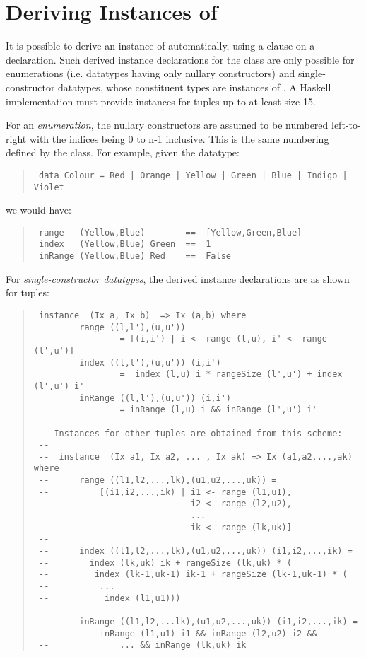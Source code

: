 \section{Deriving Instances of 
}
It is possible to derive an instance of  automatically, using
a  clause on a  declaration.
Such derived instance declarations for the class  are only possible
for enumerations (i.e. datatypes having
only nullary constructors) and single-constructor datatypes,
whose constituent types are instances of .   A Haskell implementation
must provide  instances for tuples up to at least size 15.
\par
For an \emph{enumeration}, the nullary constructors are assumed to be
numbered left-to-right with the indices being 0 to n-1 inclusive.
This is the same numbering defined by the  class.  For example,
given the datatype:
\par
\begin{quote}
{\haddockverb\begin{verbatim}
 data Colour = Red | Orange | Yellow | Green | Blue | Indigo | Violet
\end{verbatim}}
\end{quote}
we would have:
\par
\begin{quote}
{\haddockverb\begin{verbatim}
 range   (Yellow,Blue)        ==  [Yellow,Green,Blue]
 index   (Yellow,Blue) Green  ==  1
 inRange (Yellow,Blue) Red    ==  False
\end{verbatim}}
\end{quote}
For \emph{single-constructor datatypes}, the derived instance declarations
are as shown for tuples:
\par
\begin{quote}
{\haddockverb\begin{verbatim}
 instance  (Ix a, Ix b)  => Ix (a,b) where
         range ((l,l'),(u,u'))
                 = [(i,i') | i <- range (l,u), i' <- range (l',u')]
         index ((l,l'),(u,u')) (i,i')
                 =  index (l,u) i * rangeSize (l',u') + index (l',u') i'
         inRange ((l,l'),(u,u')) (i,i')
                 = inRange (l,u) i && inRange (l',u') i'
 
 -- Instances for other tuples are obtained from this scheme:
 --
 --  instance  (Ix a1, Ix a2, ... , Ix ak) => Ix (a1,a2,...,ak)  where
 --      range ((l1,l2,...,lk),(u1,u2,...,uk)) =
 --          [(i1,i2,...,ik) | i1 <- range (l1,u1),
 --                            i2 <- range (l2,u2),
 --                            ...
 --                            ik <- range (lk,uk)]
 --
 --      index ((l1,l2,...,lk),(u1,u2,...,uk)) (i1,i2,...,ik) =
 --        index (lk,uk) ik + rangeSize (lk,uk) * (
 --         index (lk-1,uk-1) ik-1 + rangeSize (lk-1,uk-1) * (
 --          ...
 --           index (l1,u1)))
 --
 --      inRange ((l1,l2,...lk),(u1,u2,...,uk)) (i1,i2,...,ik) =
 --          inRange (l1,u1) i1 && inRange (l2,u2) i2 &&
 --              ... && inRange (lk,uk) ik
\end{verbatim}}
\end{quote}
